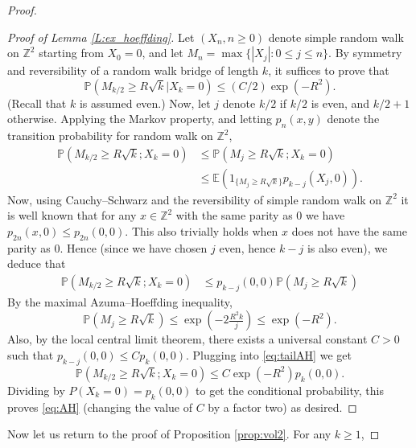 \documentclass[11pt]{article}
\begin{document}
\begin{proof}
\begin{proof}[Proof of Lemma \ref{L:ex_hoeffding}]
    Let $(X_n, n\ge 0)$ denote simple random walk on $\mathbb{Z}^2$ starting from $X_0 = 0$, and let $M_n = 
    \max \{|X_j|:0
    \le j \le n \}$.  
    By symmetry and reversibility of a random walk bridge of length $k$, it suffices to prove that 
    \begin{equation}\label{eq:AH}
    \mathbb{P}( M_{k/2} \geq R \sqrt{k} | X_k = 0) \leq (C/2) \exp(-R^2).
    \end{equation}
    (Recall that $k$ is assumed even.) 
    Now, let $j$ denote $k/2$ if $k/2$ is even, and $k/2+1$ otherwise. 
    Applying the Markov property, and letting $p_n(x,y)$ denote the transition probability for random walk on $\mathbb{Z}^2$, 
    \begin{align*}
    \mathbb{P}( M_{k/2} \geq R \sqrt{k} ; X_k = 0) 
    &\le \mathbb{P}( M_j 
    \geq  R \sqrt{k} ; X_k = 0) \\
    & \leq \mathbb{E}( 1_{
    \{M_{j} \ge R\sqrt{k}\}} p_{k-j}(X_j,0))  .
    \end{align*}
    Now, using Cauchy--Schwarz and the reversibility of simple random walk on $
    \mathbb{Z}^2$ it is well known that for any $x\in \mathbb{Z}^2$ with the same parity as 0 we have $p_{2n}(x,0) \le p_{2n} (0,0)$. This also trivially holds when $x$ does not have the same parity as 0. Hence (since we have chosen $j$ even, hence $k-j$ is also even), we deduce that 
    \begin{align}\label{eq:tailAH}
    \mathbb{P}( M_{k/2} \geq R \sqrt{k} ; X_k = 0)  &\le p_{k-j} (0,0) \mathbb{P}( M_j 
    \geq  R \sqrt{k} )
    \end{align}
    By the maximal Azuma--Hoeffding inequality,
    $$
    \mathbb{P}( M_j 
    \geq  R \sqrt{k} )\le \exp ( - 2\tfrac{R^2k}{j}) \le \exp ( - R^2).
    $$
    Also, by the local central limit theorem, there exists a universal constant $C>0$ such that $p_{k-j}(0,0) \le C p_k(0,0)$. Plugging into \eqref{eq:tailAH} we get
    \[
    \mathbb{P}( M_{k/2} \geq R \sqrt{k} ; X_k = 0)  \le C \exp(-R^2) p_k(0,0).
    \]
    Dividing by $
    P(X_k =0) = p_k(0,0)$ to get the conditional probability, this proves \eqref{eq:AH} (changing the value of $C$ by a factor two) as desired. 
\end{proof}

    
    Now let us return to the proof of Proposition \ref{prop:vol2}.    For any $k\geq 1$, 
    

\end{proof}
\end{document}
